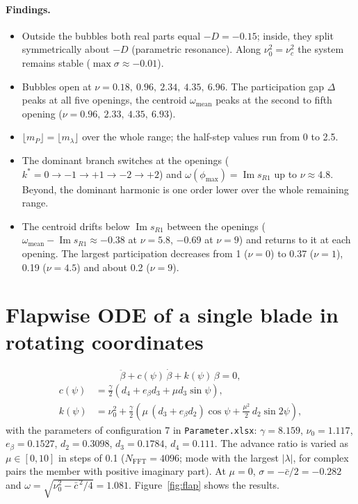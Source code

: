 \documentclass[11pt,a4paper]{article}
\newcommand{\Ima}{\operatorname{Im}}
\begin{document}
\paragraph{Findings.}
\begin{itemize}
  \item Outside the bubbles both real parts equal $-D = -0.15$; inside, they split
        symmetrically about $-D$ (parametric resonance). Along $\nu_0^2 = \nu_c^2$ the
        system remains stable ($\max\sigma \approx -0.01$).
  \item Bubbles open at $\nu = 0.18,\ 0.96,\ 2.34,\ 4.35,\ 6.96$. The participation gap
        $\Delta$ peaks at all five openings, the centroid $\omega_\text{mean}$ peaks at the
        second to fifth opening ($\nu = 0.96,\ 2.33,\ 4.35,\ 6.93$).
  \item $\lfloor m_P\rfloor = \lfloor m_\lambda\rfloor$ over the whole range; the
        half-step values run from 0 to 2.5.
  \item The dominant branch switches at the openings ($k^* = 0 \to -1 \to +1 \to -2 \to +2$)
        and $\omega(\phi_\text{max}) = \Ima s_{R1}$ up to $\nu \approx 4.8$. Beyond, the
        dominant harmonic is one order lower over the whole remaining range.
  \item The centroid drifts below $\Ima s_{R1}$ between the openings
        ($\omega_\text{mean} - \Ima s_{R1} \approx -0.38$ at $\nu = 5.8$, $-0.69$ at
        $\nu = 9$) and returns to it at each opening. The largest participation decreases
        from 1 ($\nu = 0$) to 0.37 ($\nu = 1$), 0.19 ($\nu = 4.5$) and about 0.2 ($\nu = 9$).
\end{itemize}

\section{Flapwise ODE of a single blade in rotating coordinates}
\begin{equation}
  \ddot\beta + c(\psi)\,\dot\beta + k(\psi)\,\beta = 0,
\end{equation}
\begin{align}
  c(\psi) &= \frac{\gamma}{2}\left(d_4 + e_\beta d_3 + \mu d_3 \sin\psi\right), \\
  k(\psi) &= \nu_0^2 + \frac{\gamma}{2}\left(\mu\,(d_3 + e_\beta d_2)\cos\psi
             + \frac{\mu^2}{2}\,d_2 \sin 2\psi\right),
\end{align}
with the parameters of configuration 7 in \texttt{Parameter.xlsx}: $\gamma = 8.159$,
$\nu_0 = 1.117$, $e_\beta = 0.1527$, $d_2 = 0.3098$, $d_3 = 0.1784$, $d_4 = 0.111$.
The advance ratio is varied as $\mu \in [0, 10]$ in steps of 0.1 ($N_\text{FFT} = 4096$;
mode with the largest $|\lambda|$, for complex pairs the member with positive imaginary
part). At $\mu = 0$, $\sigma = -\bar c/2 = -0.282$ and
$\omega = \sqrt{\nu_0^2 - \bar c^{\,2}/4} = 1.081$. Figure~\ref{fig:flap} shows the results.
\end{document}
